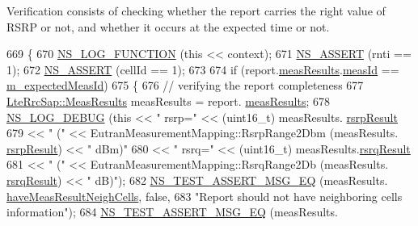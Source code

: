 Verification consists of checking whether the report carries the right value of R\+S\+RP or not, and whether it occurs at the expected time or not. 
\begin{DoxyCode}
669 \{
670   \hyperlink{log-macros-disabled_8h_a90b90d5bad1f39cb1b64923ea94c0761}{NS\_LOG\_FUNCTION} (\textcolor{keyword}{this} << context);
671   \hyperlink{assert_8h_a6dccdb0de9b252f60088ce281c49d052}{NS\_ASSERT} (rnti == 1);
672   \hyperlink{assert_8h_a6dccdb0de9b252f60088ce281c49d052}{NS\_ASSERT} (cellId == 1);
673 
674   \textcolor{keywordflow}{if} (report.\hyperlink{structns3_1_1LteRrcSap_1_1MeasurementReport_a84a65ffec25d719fdcba03fb28ca5b86}{measResults}.\hyperlink{structns3_1_1LteRrcSap_1_1MeasResults_a1608bbea7e59da137c1b58d3bf55e907}{measId} == \hyperlink{classLteUeMeasurementsPiecewiseTestCase1_a39095f59bf1a01ce9b08d52ee7b89340}{m\_expectedMeasId})
675     \{
676       \textcolor{comment}{// verifying the report completeness}
677       \hyperlink{structns3_1_1LteRrcSap_1_1MeasResults}{LteRrcSap::MeasResults} measResults = report.
      \hyperlink{structns3_1_1LteRrcSap_1_1MeasurementReport_a84a65ffec25d719fdcba03fb28ca5b86}{measResults};
678       \hyperlink{group__logging_ga413f1886406d49f59a6a0a89b77b4d0a}{NS\_LOG\_DEBUG} (\textcolor{keyword}{this} << \textcolor{stringliteral}{" rsrp="} << (uint16\_t) measResults.
      \hyperlink{structns3_1_1LteRrcSap_1_1MeasResults_a4d7bf8765525493fe5f5cccdbf94ab8b}{rsrpResult}
679                          << \textcolor{stringliteral}{" ("} << EutranMeasurementMapping::RsrpRange2Dbm (measResults.
      \hyperlink{structns3_1_1LteRrcSap_1_1MeasResults_a4d7bf8765525493fe5f5cccdbf94ab8b}{rsrpResult}) << \textcolor{stringliteral}{" dBm)"}
680                          << \textcolor{stringliteral}{" rsrq="} << (uint16\_t) measResults.\hyperlink{structns3_1_1LteRrcSap_1_1MeasResults_a6a64246cfa5d09eb42120890de3dca32}{rsrqResult}
681                          << \textcolor{stringliteral}{" ("} << EutranMeasurementMapping::RsrqRange2Db (measResults.
      \hyperlink{structns3_1_1LteRrcSap_1_1MeasResults_a6a64246cfa5d09eb42120890de3dca32}{rsrqResult}) << \textcolor{stringliteral}{" dB)"});
682       \hyperlink{group__testing_ga2a9d78cffb3db8e867c35fff0b698cf5}{NS\_TEST\_ASSERT\_MSG\_EQ} (measResults.
      \hyperlink{structns3_1_1LteRrcSap_1_1MeasResults_a1a102ebfb647fe85739933dcd2532736}{haveMeasResultNeighCells}, \textcolor{keyword}{false},
683                              \textcolor{stringliteral}{"Report should not have neighboring cells information"});
684       \hyperlink{group__testing_ga2a9d78cffb3db8e867c35fff0b698cf5}{NS\_TEST\_ASSERT\_MSG\_EQ} (measResults.

\end{DoxyCode}

